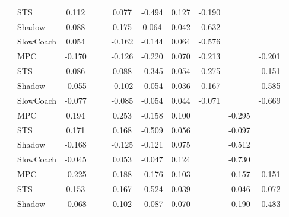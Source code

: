 \begin{tabular}{|l|l|*{9}{c|}}
                                                           & STS &    0.112 &        &        &  0.077 & -0.494 &  0.127 &  -0.190 &      &       \\
                                                           & Shadow &    0.088 &        &        &  0.175 &  0.064 &  0.042 &  -0.632 &      &       \\
                                                           & SlowCoach &    0.054 &        &        & -0.162 & -0.144 &  0.064 &  -0.576 &      &       \\
\midrule
[True, False, False, True, True, True, True, False, True] & MPC &   -0.170 &        &        & -0.126 & -0.220 &  0.070 &  -0.213 &      &   -0.201 \\
                                                           & STS &    0.086 &        &        &  0.088 & -0.345 &  0.054 &  -0.275 &      &   -0.151 \\
                                                           & Shadow &   -0.055 &        &        & -0.102 & -0.054 &  0.036 &  -0.167 &      &   -0.585 \\
                                                           & SlowCoach &   -0.077 &        &        & -0.085 & -0.054 &  0.044 &  -0.071 &      &   -0.669 \\
\midrule
[True, False, False, True, True, True, False, True, False] & MPC &    0.194 &        &        &  0.253 & -0.158 &  0.100 &      &  -0.295 &       \\
                                                           & STS &    0.171 &        &        &  0.168 & -0.509 &  0.056 &      &  -0.097 &       \\
                                                           & Shadow &   -0.168 &        &        & -0.125 & -0.121 &  0.075 &      &  -0.512 &       \\
                                                           & SlowCoach &   -0.045 &        &        &  0.053 & -0.047 &  0.124 &      &  -0.730 &       \\
\midrule
[True, False, False, True, True, True, False, True, True] & MPC &   -0.225 &        &        &  0.188 & -0.176 &  0.103 &      &  -0.157 &   -0.151 \\
                                                           & STS &    0.153 &        &        &  0.167 & -0.524 &  0.039 &      &  -0.046 &   -0.072 \\
                                                           & Shadow &   -0.068 &        &        &  0.102 & -0.087 &  0.070 &      &  -0.190 &   -0.483 \\

\end{tabular}
